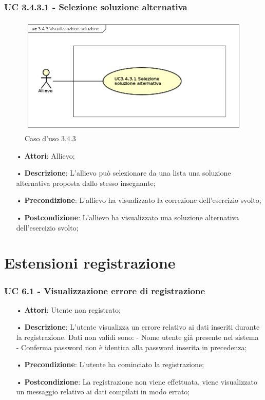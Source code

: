 \subsubsection{UC 3.4.3.1 - Selezione soluzione alternativa}
\begin{figure}[H]
\centering
\includegraphics[width=17cm]{img/UC343.png} 
\caption{Caso d'uso 3.4.3}\label{fig:343}
\end{figure}
\begin{itemize}
\item[•]\textbf{Attori}: Allievo;
\item[•]\textbf{Descrizione}: L’allievo può selezionare da una lista una soluzione alternativa proposta dallo stesso insegnante;
\item[•]\textbf{Precondizione}: L’allievo ha visualizzato la correzione dell’esercizio svolto;
\item[•]\textbf{Postcondizione}: L’allievo ha visualizzato una soluzione alternativa dell’esercizio svolto;
\end{itemize}

\section{Estensioni registrazione}
\subsubsection{UC 6.1 - Visualizzazione errore di registrazione}
\begin{itemize}
\item[•]\textbf{Attori}: Utente non registrato;
\item[•]\textbf{Descrizione}: L’utente visualizza un errore relativo ai dati inseriti durante la registrazione.
Dati non validi sono:
 - Nome utente già presente nel sistema
 - Conferma password non è identica alla password inserita in precedenza;
\item[•]\textbf{Precondizione}: L’utente ha cominciato la registrazione;
\item[•]\textbf{Postcondizione}: La registrazione non viene effettuata, viene visualizzato un messaggio relativo ai dati compilati in modo errato;
\end{itemize}


